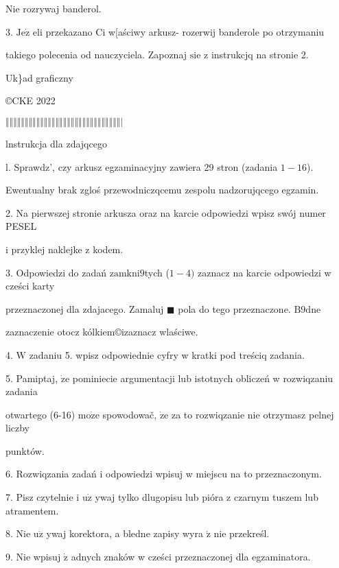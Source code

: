 \documentclass[a4paper,12pt]{article}
\begin{document}
Nie rozrywaj banderol.

3. $\mathrm{J}\mathrm{e}\dot{\mathrm{z}}$ eli przekazano Ci w[aściwy arkusz- rozerwij banderole po otrzymaniu

takiego polecenia od nauczyciela. Zapoznaj $\mathrm{s}\mathrm{i}\mathrm{e}$ z instrukcjq na stronie 2.

Uk\}ad graficzny

\copyright CKE 2022

$\Vert\Vert\Vert\Vert\Vert\Vert\Vert\Vert\Vert\Vert\Vert\Vert\Vert\Vert\Vert\Vert\Vert\Vert\Vert\Vert\Vert\Vert\Vert\Vert\Vert\Vert\Vert\Vert\Vert\Vert|$




lnstrukcja dla zdajqcego

l. Sprawdz', czy arkusz egzaminacyjny zawiera 29 stron (zadania $1-16$).

Ewentualny brak zgloś przewodniczqcemu zespolu nadzorujqcego egzamin.

2. Na pierwszej stronie arkusza oraz na karcie odpowiedzi wpisz swój numer PESEL

i przyklej naklejke z kodem.

3. Odpowiedzi do zadań $\mathrm{z}\mathrm{a}\mathrm{m}\mathrm{k}\mathrm{n}\mathrm{i}9$tych ($1-4)$ zaznacz na karcie odpowiedzi w cześci karty

przeznaczonej dla zdajacego. Zamaluj $\blacksquare$ pola do tego przeznaczone. $\mathrm{B}9\mathrm{d}\mathrm{n}\mathrm{e}$

zaznaczenie otocz kólkiem\copyright izaznacz wlaściwe.

4. $\mathrm{W}$ zadaniu 5. wpisz odpowiednie cyfry w kratki pod treściq zadania.

5. Pamiptaj, $\dot{\mathrm{z}}\mathrm{e}$ pominiecie argumentacji lub istotnych obliczeń w rozwiqzaniu zadania

otwartego (6-16) $\mathrm{m}\mathrm{o}\dot{\mathrm{z}}\mathrm{e}$ spowodowač, $\dot{\mathrm{z}}\mathrm{e}$ za to rozwiqzanie nie otrzymasz pelnej liczby

punktów.

6. Rozwiqzania zadań i odpowiedzi wpisuj w miejscu na to przeznaczonym.

7. Pisz czytelnie i $\mathrm{u}\dot{\mathrm{z}}$ ywaj tylko dlugopisu lub pióra z czarnym tuszem lub atramentem.

8. Nie $\mathrm{u}\dot{\mathrm{z}}$ ywaj korektora, a bledne zapisy wyra $\acute{\mathrm{z}}$ nie przekreśl.

9. Nie wpisuj $\dot{\mathrm{z}}$ adnych znaków w cześci przeznaczonej dla egzaminatora.
\end{document}
